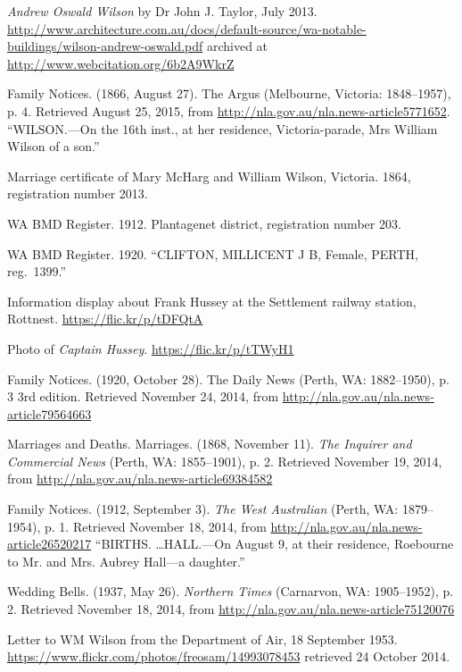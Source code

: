 \begin{thebibliography}{999}
	\emph{Andrew Oswald Wilson} by Dr John J. Taylor, July 2013.
	\url{http://www.architecture.com.au/docs/default-source/wa-notable-buildings/wilson-andrew-oswald.pdf}
	archived at \url{http://www.webcitation.org/6b2A9WkrZ}

	Family Notices. (1866, August 27). The Argus (Melbourne, Victoria: 1848--1957), p. 4.
	Retrieved August 25, 2015, from \url{http://nla.gov.au/nla.news-article5771652}.
	``WILSON.---On the 16th inst., at her residence, Victoria-parade, Mrs William Wilson of a son.''

	Marriage certificate of Mary McHarg and William Wilson, Victoria. 1864, registration number 2013.

	WA BMD Register. 1912. Plantagenet district, registration number 203.

	WA BMD Register. 1920.
	``CLIFTON, MILLICENT J B, Female, PERTH, reg.\ 1399.''

	Information display about Frank Hussey at the Settlement railway station, Rottnest.
	\url{https://flic.kr/p/tDFQtA}

	Photo of \emph{Captain Hussey}. \url{https://flic.kr/p/tTWyH1}

	Family Notices. (1920, October 28). The Daily News (Perth, WA: 1882--1950), p. 3 3rd edition.
	Retrieved November 24, 2014, from \url{http://nla.gov.au/nla.news-article79564663}

	Marriages and Deaths. Marriages. (1868, November 11).
	\emph{The Inquirer and Commercial News} (Perth, WA: 1855--1901), p. 2.
	Retrieved November 19, 2014, from \url{http://nla.gov.au/nla.news-article69384582}

	Family Notices. (1912, September 3). \emph{The West Australian} (Perth, WA: 1879--1954), p. 1.
	Retrieved November 18, 2014, from \url{http://nla.gov.au/nla.news-article26520217}
	``BIRTHS. \dots HALL.---On August 9, at their residence, Roebourne to Mr. and Mrs. Aubrey Hall---a daughter.''

	Wedding Bells. (1937, May 26). \emph{Northern Times} (Carnarvon, WA: 1905--1952), p. 2.
	Retrieved November 18, 2014, from \url{http://nla.gov.au/nla.news-article75120076}

	Letter to WM Wilson from the Department of Air, 18 September 1953.
	\url{https://www.flickr.com/photos/freosam/14993078453} retrieved 24 October 2014.


\end{thebibliography}
